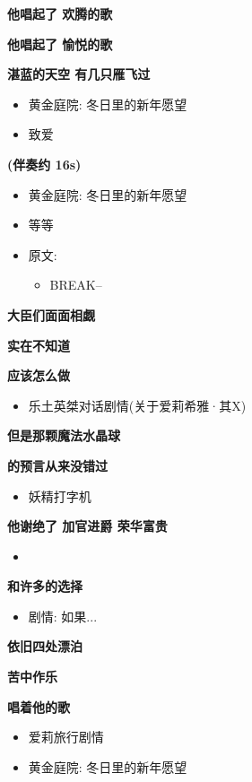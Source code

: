 \documentclass[a4paper]{article}
\begin{document}
\textbf{他唱起了 欢腾的歌}

\textbf{他唱起了 愉悦的歌}

\textbf{湛蓝的天空 有几只雁飞过}

\begin{itemize}
    \item 黄金庭院: 冬日里的新年愿望
    \item 致爱
\end{itemize}

\textbf{(伴奏约 16s)}

\begin{itemize}
    \item 黄金庭院: 冬日里的新年愿望
    \item 等等
    \item 原文:
    \begin{itemize}
        \item BREAK--
    \end{itemize}
\end{itemize}

\textbf{大臣们面面相觑}

\textbf{实在不知道}

\textbf{应该怎么做}

\begin{itemize}
    \item 乐土英桀对话剧情(关于爱莉希雅·其X)
\end{itemize}

\textbf{但是那颗魔法水晶球}

\textbf{的预言从来没错过}

\begin{itemize}
    \item 妖精打字机
\end{itemize}

\textbf{他谢绝了 加官进爵 荣华富贵}

\begin{itemize}
    \item 
\end{itemize}

\textbf{和许多的选择}

\begin{itemize}
    \item 剧情: 如果...
\end{itemize}

\textbf{依旧四处漂泊}

\textbf{苦中作乐}

\textbf{唱着他的歌}

\begin{itemize}
    \item 爱莉旅行剧情
    \item 黄金庭院: 冬日里的新年愿望
\end{itemize}
\end{document}
